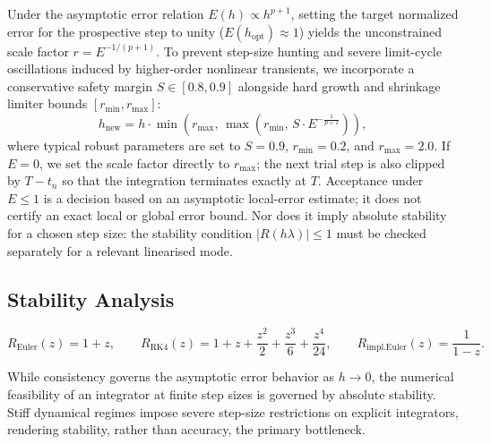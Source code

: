 \documentclass[11pt,a4paper]{article}
\theoremstyle{definition}
\theoremstyle{remark}
\begin{document}
Under the asymptotic error relation $E(h) \propto h^{p+1}$, setting the target normalized error for the prospective step to unity ($E(h_{\text{opt}}) \approx 1$) yields the unconstrained scale factor $r = E^{-1/(p+1)}$. To prevent step-size hunting and severe limit-cycle oscillations induced by higher-order nonlinear transients, we incorporate a conservative safety margin $S \in [0.8, 0.9]$ alongside hard growth and shrinkage limiter bounds $[r_{\min}, r_{\max}]$:
\begin{equation}
\label{eq:step_update_formula}
h_{\text{new}} = h \cdot \min\left(r_{\max}, \, \max\left(r_{\min}, \, S \cdot E^{-\frac{1}{p+1}}\right)\right),
\end{equation}
where typical robust parameters are set to $S = 0.9$, $r_{\min} = 0.2$, and $r_{\max} = 2.0$. If $E=0$, we set the scale factor directly to $r_{\max}$; the next trial step is also clipped by $T-t_n$ so that the integration terminates exactly at $T$.
Acceptance under $E\leq1$ is a decision based on an asymptotic local-error estimate; it does not certify an exact local or global error bound. Nor does it imply absolute stability for a chosen step size: the stability condition $|R(h\lambda)|\leq1$ must be checked separately for a relevant linearised mode.

\subsection{Stability Analysis}
\label{sec:stability_analysis}

\begin{equation}
    R_{\text{Euler}}(z) = 1 + z, \qquad
    R_{\text{RK4}}(z) = 1 + z + \frac{z^2}{2} + \frac{z^3}{6} + \frac{z^4}{24},
    \qquad
    R_{\text{impl.Euler}}(z) = \frac{1}{1 - z}.
\end{equation}

While consistency governs the asymptotic error behavior as $h \to 0$, the numerical feasibility of an integrator at finite step sizes is governed by absolute stability. Stiff dynamical regimes impose severe step-size restrictions on explicit integrators, rendering stability, rather than accuracy, the primary bottleneck.
\end{document}
